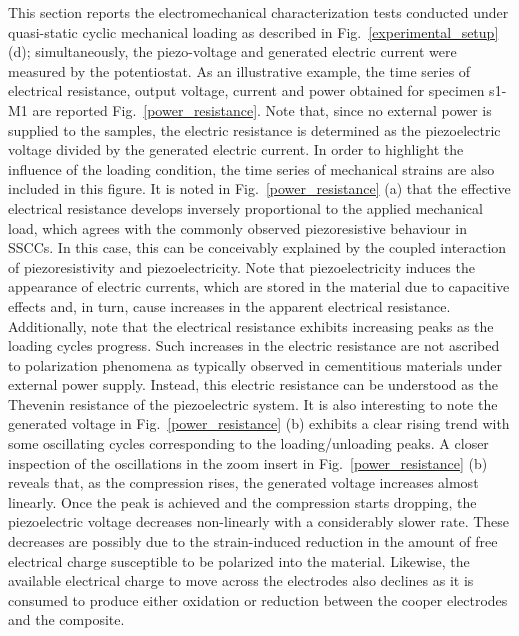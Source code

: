 \documentclass[a4paper,fleqn]{cas-sc}
\begin{document}
This section reports the electromechanical characterization tests conducted under quasi-static cyclic mechanical loading as described in Fig.~\ref{experimental_setup} (d); simultaneously, the piezo-voltage and generated electric current were measured by the potentiostat. As an illustrative example, the time series of electrical resistance, output voltage, current and power obtained for specimen s1-M1 are reported Fig.~\ref{power_resistance}. Note that, since no external power is supplied to the samples, the electric resistance is determined as the piezoelectric voltage divided by the generated electric current. In order to highlight the influence of the loading condition, the time series of mechanical strains are also included in this figure. It is noted in Fig.~\ref{power_resistance} (a) that the effective electrical resistance develops inversely proportional to the applied mechanical load, which agrees with the commonly observed piezoresistive behaviour in SSCCs. In this case, this can be conceivably explained by the coupled interaction of piezoresistivity and piezoelectricity. Note that piezoelectricity induces the appearance of electric currents, which are stored in the material due to capacitive effects and, in turn, cause increases in the apparent electrical resistance. Additionally, note that the electrical resistance exhibits increasing peaks as the loading cycles progress. Such increases in the electric resistance are not ascribed to polarization phenomena as typically observed in cementitious materials under external power supply. Instead, this electric resistance can be understood as the Thevenin resistance of the piezoelectric system. It is also interesting to note the generated voltage in Fig.~\ref{power_resistance} (b) exhibits a clear rising trend with some oscillating cycles corresponding to the loading/unloading peaks. A closer inspection of the oscillations in the zoom insert in Fig.~\ref{power_resistance} (b) reveals that, as the compression rises, the generated voltage increases almost linearly. Once the peak is achieved and the compression starts dropping, the piezoelectric voltage decreases non-linearly with a considerably slower rate. These decreases are possibly due to the strain-induced reduction in the amount of free electrical charge susceptible to be polarized into the material. Likewise, the available electrical charge to move across the electrodes also declines as it is consumed to produce either oxidation or reduction between the cooper electrodes and the composite. 
\end{document}
